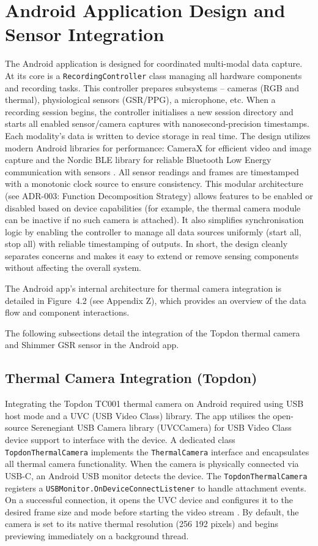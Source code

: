 \section{Android Application Design and Sensor Integration}\label{sec:4-2}
The Android application is designed for coordinated multi-modal data capture. At its core is a \texttt{RecordingController} class managing all hardware components and recording tasks. This controller prepares subsystems -- cameras (RGB and thermal), physiological sensors (GSR/PPG), a microphone, etc. When a recording session begins, the controller initialises a new session directory and starts all enabled sensor/camera captures with nanosecond-precision timestamps. Each modality's data is written to device storage in real time. The design utilizes modern Android libraries for performance: CameraX for efficient video and image capture \cite{ref13} and the Nordic BLE library for reliable Bluetooth Low Energy communication with sensors \cite{ref14}. All sensor readings and frames are timestamped with a monotonic clock source to ensure consistency. This modular architecture (see ADR-003: Function Decomposition Strategy) allows features to be enabled or disabled based on device capabilities (for example, the thermal camera module can be inactive if no such camera is attached). It also simplifies synchronisation logic by enabling the controller to manage all data sources uniformly (start all, stop all) with reliable timestamping of outputs. In short, the design cleanly separates concerns and makes it easy to extend or remove sensing components without affecting the overall system.

The Android app's internal architecture for thermal camera integration is detailed in Figure~4.2 (see Appendix Z), which provides an overview of the data flow and component interactions.

The following subsections detail the integration of the Topdon thermal camera and Shimmer GSR sensor in the Android app.

\subsection{Thermal Camera Integration (Topdon)}\label{sec:4-2-1}
Integrating the Topdon TC001 thermal camera on Android required using USB host mode and a UVC (USB Video Class) library. The app utilises the open-source Serenegiant USB Camera library (UVCCamera) for USB Video Class device support \cite{ref16} to interface with the device. A dedicated class \texttt{TopdonThermalCamera} implements the \texttt{ThermalCamera} interface and encapsulates all thermal camera functionality. When the camera is physically connected via USB-C, an Android USB monitor detects the device. The \texttt{TopdonThermalCamera} registers a \texttt{USBMonitor.OnDeviceConnectListener} to handle attachment events. On a successful connection, it opens the UVC device and configures it to the desired frame size and mode before starting the video stream \cite{ref16}. By default, the camera is set to its native thermal resolution (256\,\texttimes\,192 pixels) and begins previewing immediately on a background thread.

